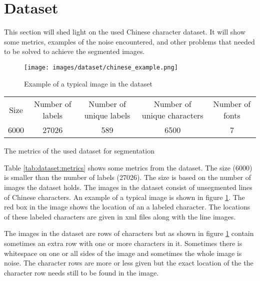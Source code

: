 \section{Dataset} %
\label{sec:dataset}

This section will shed light on the used Chinese character dataset. It will show some metrics, examples of the noise encountered, and other problems that needed to be solved to achieve the segmented images.

\begin{figure}
 \centering
\texttt{[image: images/dataset/chinese\_example.png]}
 \caption{Example of a typical image in the dataset}
 \label{fig:dataset:chinese:example}
\end{figure}

\bigskip

\begin{minipage}{\linewidth}
\flushleft
{} \label{tab:dataset:metrics} 
\begin{tabular}{ c c c c c }
\hline
\hline
Size		& Number of labels 	& Number of unique labels	& Number of unique characters	& Number of fonts\\
6000 		& 27026				& 589						& 6500							& 7\\
\hline
\end{tabular}\par
\bigskip
The metrics of the used dataset for segmentation
\end{minipage}

\bigskip

\noindent Table \ref{tab:dataset:metrics} shows some metrics from the dataset. The size (6000) is smaller than the number of labels (27026). The size is based on the number of images the dataset holds. The images in the dataset consist of unsegmented lines of Chinese characters. An example of a typical image is shown in figure \ref{fig:dataset:chinese:example}. The red box in the image shows the location of an a labeled character. The locations of these labeled characters are given in xml files along with the line images.

The images in the dataset are rows of characters but as shown in figure \ref{fig:dataset:chinese:example} contain sometimes an extra row with one or more characters in it. Sometimes there is whitespace on one or all sides of the image and sometimes the whole image is noise. The character rows are more or less given but the exact location of the the character row needs still to be found in the image.

